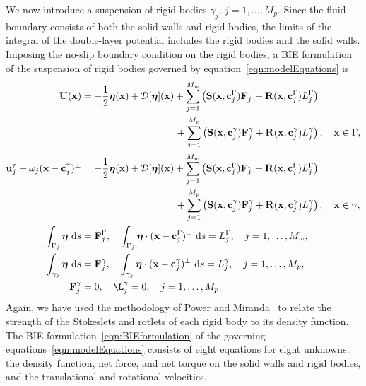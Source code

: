 \documentclass[preprint, 10pt]{elsarticle}
\begin{document}
We now introduce a suspension of rigid bodies $\gamma_j$,
$j=1,\ldots,M_p$.  Since the fluid boundary consists of both the solid
walls and rigid bodies, the limits of the integral of the double-layer
potential includes the rigid bodies and the solid walls.  Imposing the
no-slip boundary condition on the rigid bodies, a BIE formulation of the
suspension of rigid bodies governed by
equation~\eqref{eqn:modelEquations} is
\begin{subequations}
  \label{eqn:BIEformulation}
  \begin{align}
    \UU(\xx) &= -\frac{1}{2}\eeta(\xx) + \DD[\eeta](\xx) +
    \sum_{j=1}^{M_w} \left(\mathbf{S}(\xx,\cc^\Gamma_j)\FF^\Gamma_j + 
      \mathbf{R}(\xx,\cc^\Gamma_j)L^\Gamma_j\right)  \nonumber \\
&\hspace{96pt}+\sum_{j=1}^{M_p} \left(\mathbf{S}(\xx,\cc^\gamma_j)\FF^\gamma_j +
\mathbf{R}(\xx,\cc^\gamma_j)L^\gamma_j\right),
    \quad \xx \in \Gamma, \label{eqn:BIEformulation1} \\
  \uu^\tau_j + \omega_j(\xx - \cc_j^\gamma)^\perp &=
    -\frac{1}{2}\eeta(\xx) + \DD[\eeta](\xx) + 
    \sum_{j=1}^{M_w} \left(\mathbf{S}(\xx,\cc^\Gamma_j)\FF^\Gamma_j + 
      \mathbf{R}(\xx,\cc^\Gamma_j)L^\Gamma_j\right) \nonumber \\
&\hspace{96pt}+\sum_{j=1}^{M_p} \left(\mathbf{S}(\xx,\cc^\gamma_j)\FF^\gamma_j +
\mathbf{R}(\xx,\cc^\gamma_j)L^\gamma_j\right),
    \quad \xx \in \gamma, \label{eqn:BIEformulation2} \\
  \int_{\Gamma_j} \eeta~\text{d}s &= \FF^\Gamma_j, \quad
  \int_{\Gamma_j} \eeta\cdot (\xx - \cc^\Gamma_j)^\perp~\text{d}s =
  L^\Gamma_j, \quad j=1,\ldots,M_w, \label{eqn:BIEformulation3} \\
  \int_{\gamma_j} \eeta~\text{d}s &= \FF^\gamma_j, \quad
  \int_{\gamma_j} \eeta\cdot (\xx - \cc^\gamma_j)^\perp~\text{d}s =
  L^\gamma_j,\quad j=1,\ldots,M_p, \label{eqn:BIEformulation4} \\
  \FF^\gamma_j &= 0, \quad \L^\gamma_j = 0,\quad j=1,\ldots,M_p.
  \label{eqn:BIEformulation5}
\end{align}
\end{subequations}
Again, we have used the methodology of Power and
Miranda~\cite{Power1987, Power1993} to relate the strength of the
Stokeslets and rotlets of each rigid body to its density function.  The
BIE formulation~\eqref{eqn:BIEformulation} of the governing
equations~\eqref{eqn:modelEquations} consists of eight equations for
eight unknowns: the density function, net force, and net torque on the
solid walls and rigid bodies, and the translational and rotational
velocities.
\end{document}
